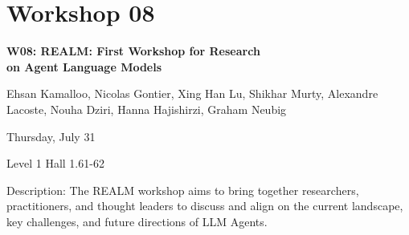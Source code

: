 \clearpage



\section[W08: REALM: First Workshop for Research on Agent Language Models]{Workshop 08}
\label{workshop_8}

\begin{center}
    {\Large \textbf{W08: REALM: First Workshop for Research \\
    on Agent Language Models}}\\

 \vspace{5mm}

    Ehsan Kamalloo, Nicolas Gontier, Xing Han Lu, Shikhar Murty, Alexandre Lacoste, Nouha Dziri, Hanna Hajishirzi, Graham Neubig\\

 \vspace{5mm}
 
    Thursday, July 31
    
    Level 1 Hall 1.61-62

\end{center}

Description: The REALM workshop aims to bring together researchers, practitioners, and thought leaders to discuss and align on the current landscape, key challenges, and future directions of LLM Agents.



